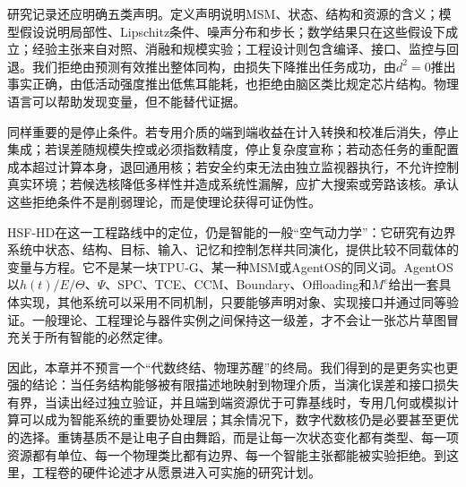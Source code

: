 研究记录还应明确五类声明。定义声明说明MSM、状态、结构和资源的含义；模型假设说明局部性、Lipschitz条件、噪声分布和步长；数学结果只在这些假设下成立；经验主张来自对照、消融和规模实验；工程设计则包含编译、接口、监控与回退。我们拒绝由预测有效推出整体同构，由损失下降推出任务成功，由$d^2=0$推出事实正确，由低活动强度推出低焦耳能耗，也拒绝由脑区类比规定芯片结构。物理语言可以帮助发现变量，但不能替代证据。

同样重要的是停止条件。若专用介质的端到端收益在计入转换和校准后消失，停止集成；若误差随规模失控或必须指数精度，停止复杂度宣称；若动态任务的重配置成本超过计算本身，退回通用核；若安全约束无法由独立监视器执行，不允许控制真实环境；若候选核降低多样性并造成系统性漏解，应扩大搜索或旁路该核。承认这些拒绝条件不是削弱理论，而是使理论获得可证伪性。

HSF-HD在这一工程路线中的定位，仍是智能的一般“空气动力学”：它研究有边界系统中状态、结构、目标、输入、记忆和控制怎样共同演化，提供比较不同载体的变量与方程。它不是某一块TPU-G、某一种MSM或AgentOS的同义词。AgentOS以$h(t)/E/\Theta$、$\Psi$、SPC、TCE、CCM、Boundary、Offloading和$M^e$给出一套具体实现，其他系统可以采用不同机制，只要能够声明对象、实现接口并通过同等验证。一般理论、工程理论与器件实例之间保持这一级差，才不会让一张芯片草图冒充关于所有智能的必然定律。

因此，本章并不预言一个“代数终结、物理苏醒”的终局。我们得到的是更务实也更强的结论：当任务结构能够被有限描述地映射到物理介质，当演化误差和接口损失有界，当读出经过独立验证，并且端到端资源优于可靠基线时，专用几何或模拟计算可以成为智能系统的重要协处理层；其余情况下，数字代数核仍是必要甚至更优的选择。重铸基质不是让电子自由舞蹈，而是让每一次状态变化都有类型、每一项资源都有单位、每一个物理类比都有边界、每一个智能主张都能被实验拒绝。到这里，工程卷的硬件论述才从愿景进入可实施的研究计划。

